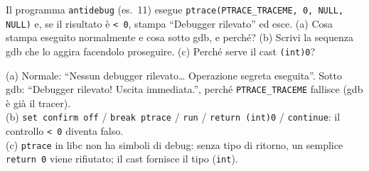 \question[6]
Il programma \lstinline|antidebug| (es.\ 11) esegue \lstinline|ptrace(PTRACE_TRACEME, 0, NULL, NULL)| e, se il risultato è \lstinline|< 0|, stampa ``Debugger rilevato'' ed esce.
(a) Cosa stampa eseguito normalmente e cosa sotto gdb, e perché? (b) Scrivi la sequenza gdb che lo aggira facendolo proseguire. (c) Perché serve il cast \lstinline|(int)0|?
\begin{solution}
(a) Normale: ``Nessun debugger rilevato\ldots{} Operazione segreta eseguita''. Sotto gdb: ``Debugger rilevato! Uscita immediata.'', perché \lstinline|PTRACE_TRACEME| fallisce (gdb è già il tracer).\\
(b) \lstinline|set confirm off| / \lstinline|break ptrace| / \lstinline|run| / \lstinline|return (int)0| / \lstinline|continue|: il controllo \lstinline|< 0| diventa falso.\\
(c) \lstinline|ptrace| in libc non ha simboli di debug: senza tipo di ritorno, un semplice \lstinline|return 0| viene rifiutato; il cast fornisce il tipo (\lstinline|int|).
\end{solution}
